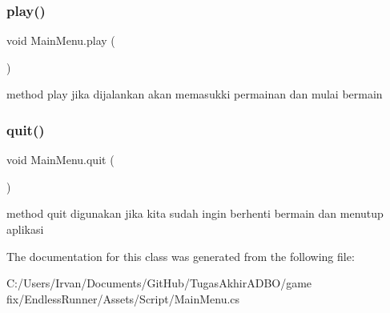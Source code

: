 \subsubsection{\texorpdfstring{play()}{play()}}
{\footnotesize\ttfamily void Main\+Menu.\+play (\begin{DoxyParamCaption}{ }\end{DoxyParamCaption})}



method play jika dijalankan akan memasukki permainan dan mulai bermain 

\hypertarget{class_main_menu_ad60c51b0265c457357538cb3a6880918}{}\label{class_main_menu_ad60c51b0265c457357538cb3a6880918} 
\subsubsection{\texorpdfstring{quit()}{quit()}}
{\footnotesize\ttfamily void Main\+Menu.\+quit (\begin{DoxyParamCaption}{ }\end{DoxyParamCaption})}



method quit digunakan jika kita sudah ingin berhenti bermain dan menutup aplikasi 



The documentation for this class was generated from the following file\+:\begin{DoxyCompactItemize}
\item 
C\+:/\+Users/\+Irvan/\+Documents/\+Git\+Hub/\+Tugas\+Akhir\+A\+D\+B\+O/game fix/\+Endless\+Runner/\+Assets/\+Script/Main\+Menu.\+cs\end{DoxyCompactItemize}

